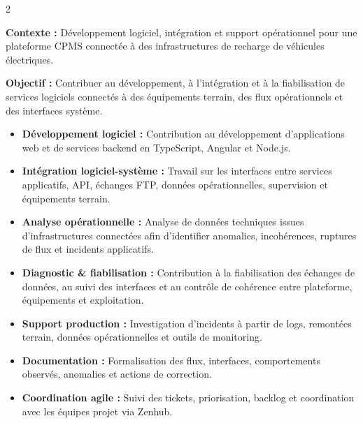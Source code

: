 \documentclass[8pt,a4paper,ragged2e,withhyper]{altacv}
\begin{document}



\makecvheader
\vspace{-0.3cm}


\begin{paracol}{2}



\textbf{Contexte :} Développement logiciel, intégration et support opérationnel pour une plateforme CPMS connectée à des infrastructures de recharge de véhicules électriques.

\textbf{Objectif :} Contribuer au développement, à l’intégration et à la fiabilisation de services logiciels connectés à des équipements terrain, des flux opérationnels et des interfaces système.

\begin{itemize}
  \item \textbf{Développement logiciel :} Contribution au développement d’applications web et de services backend en TypeScript, Angular et Node.js.
  \item \textbf{Intégration logiciel-système :} Travail sur les interfaces entre services applicatifs, API, échanges FTP, données opérationnelles, supervision et équipements terrain.
  \item \textbf{Analyse opérationnelle :} Analyse de données techniques issues d’infrastructures connectées afin d’identifier anomalies, incohérences, ruptures de flux et incidents applicatifs.
  \item \textbf{Diagnostic \& fiabilisation :} Contribution à la fiabilisation des échanges de données, au suivi des interfaces et au contrôle de cohérence entre plateforme, équipements et exploitation.
  \item \textbf{Support production :} Investigation d’incidents à partir de logs, remontées terrain, données opérationnelles et outils de monitoring.
  \item \textbf{Documentation :} Formalisation des flux, interfaces, comportements observés, anomalies et actions de correction.
  \item \textbf{Coordination agile :} Suivi des tickets, priorisation, backlog et coordination avec les équipes projet via Zenhub.
\end{itemize}


\end{paracol}
\end{document}
